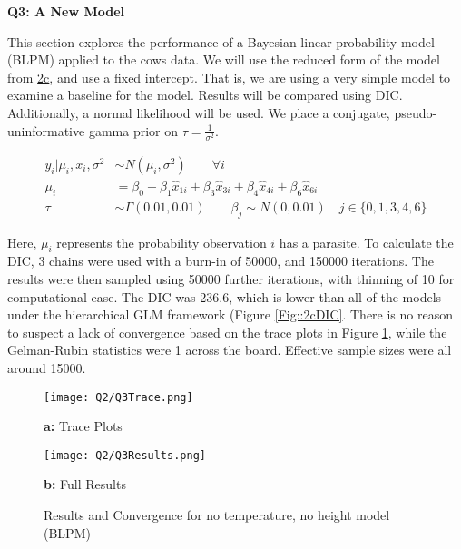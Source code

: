 \documentclass[11pt]{article}
\begin{document}
\textbf{Q3: A New Model} \label{sec::3}

This section explores the performance of a Bayesian linear probability model (BLPM) applied to the cows data. We will use the reduced form of the model from \hyperref[sec::2c]{2c}, and use a fixed intercept. That is, we are using a very simple model to examine a baseline for the model. Results will be compared using DIC. Additionally, a normal likelihood will be used. We place a conjugate, pseudo-uninformative gamma prior on $\tau = \frac{1}{\sigma^2}$. 

\begin{align*}
y_i | \mu_i, x_i, \sigma^2 &\sim N(\mu_i, \sigma^2) \qquad \forall i\\
\mu_i &= \beta_0 + \beta_1 \widehat{x}_{1i} + \beta_3 \widehat{x}_{3i} + \beta_4 \widehat{x}_{4i} + \beta_6 \widehat{x}_{6i} \\
\tau &\sim \Gamma(0.01, 0.01) \qquad \beta_j \sim N(0, 0.01)  \quad j \in \{0, 1, 3, 4, 6\}
\end{align*}

\vspace{3mm}

Here, $\mu_i$ represents the probability observation $i$ has a parasite. To calculate the DIC, 3 chains were used with a burn-in of 50000, and 150000 iterations. The results were then sampled using 50000 further iterations, with thinning of 10 for computational ease. The DIC was 236.6, which is lower than all of the models under the hierarchical GLM framework (Figure \ref{Fig::2cDIC}. There is no reason to suspect a lack of convergence based on the trace plots in Figure \ref{Fig::3TraceResults}, while the Gelman-Rubin statistics were 1 across the board. Effective sample sizes were all around 15000. 


\begin{figure}[!h]
    \begin{minipage}[l]{0.5\textwidth}
        \texttt{[image: Q2/Q3Trace.png]}
        \centerline{\textbf{a:} Trace Plots}
    \end{minipage}
    \begin{minipage}[pos=r]{0.5\textwidth}
        \texttt{[image: Q2/Q3Results.png]}
        \centerline{\textbf{b:} Full Results}
    \end{minipage}
\caption{Results and Convergence for no temperature, no height model (BLPM)} \label{Fig::3TraceResults}
\end{figure}
\end{document}
